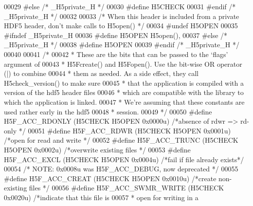 \begin{DoxyCode}
00029 \textcolor{preprocessor}{#else   }\textcolor{comment}{/* \_H5private\_H */}\textcolor{preprocessor}{}
00030 \textcolor{preprocessor}{#define H5CHECK}
00031 \textcolor{preprocessor}{#endif  }\textcolor{comment}{/* \_H5private\_H */}\textcolor{preprocessor}{}
00032 
00033 \textcolor{comment}{/* When this header is included from a private HDF5 header, don't make calls to H5open() */}
00034 \textcolor{preprocessor}{#undef H5OPEN}
00035 \textcolor{preprocessor}{#ifndef \_H5private\_H}
00036 \textcolor{preprocessor}{#define H5OPEN        H5open(),}
00037 \textcolor{preprocessor}{#else   }\textcolor{comment}{/* \_H5private\_H */}\textcolor{preprocessor}{}
00038 \textcolor{preprocessor}{#define H5OPEN}
00039 \textcolor{preprocessor}{#endif  }\textcolor{comment}{/* \_H5private\_H */}\textcolor{preprocessor}{}
00040 
00041 \textcolor{comment}{/*}
00042 \textcolor{comment}{ * These are the bits that can be passed to the `flags' argument of}
00043 \textcolor{comment}{ * H5Fcreate() and H5Fopen(). Use the bit-wise OR operator (|) to combine}
00044 \textcolor{comment}{ * them as needed.  As a side effect, they call H5check\_version() to make sure}
00045 \textcolor{comment}{ * that the application is compiled with a version of the hdf5 header files}
00046 \textcolor{comment}{ * which are compatible with the library to which the application is linked.}
00047 \textcolor{comment}{ * We're assuming that these constants are used rather early in the hdf5}
00048 \textcolor{comment}{ * session.}
00049 \textcolor{comment}{ */}
00050 \textcolor{preprocessor}{#define H5F\_ACC\_RDONLY  (H5CHECK H5OPEN 0x0000u)    }\textcolor{comment}{/*absence of rdwr => rd-only */}\textcolor{preprocessor}{}
00051 \textcolor{preprocessor}{#define H5F\_ACC\_RDWR    (H5CHECK H5OPEN 0x0001u)    }\textcolor{comment}{/*open for read and write    */}\textcolor{preprocessor}{}
00052 \textcolor{preprocessor}{#define H5F\_ACC\_TRUNC   (H5CHECK H5OPEN 0x0002u)    }\textcolor{comment}{/*overwrite existing files   */}\textcolor{preprocessor}{}
00053 \textcolor{preprocessor}{#define H5F\_ACC\_EXCL    (H5CHECK H5OPEN 0x0004u)    }\textcolor{comment}{/*fail if file already exists*/}\textcolor{preprocessor}{}
00054 \textcolor{comment}{/* NOTE: 0x0008u was H5F\_ACC\_DEBUG, now deprecated */}
00055 \textcolor{preprocessor}{#define H5F\_ACC\_CREAT   (H5CHECK H5OPEN 0x0010u)    }\textcolor{comment}{/*create non-existing files  */}\textcolor{preprocessor}{}
00056 \textcolor{preprocessor}{#define H5F\_ACC\_SWMR\_WRITE  (H5CHECK 0x0020u) }\textcolor{comment}{/*indicate that this file is}
00057 \textcolor{comment}{                                                 * open for writing in a}

\end{DoxyCode}
